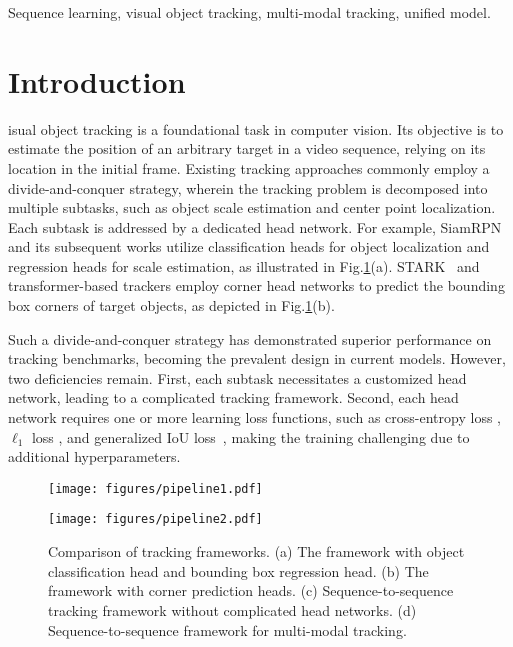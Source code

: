 \begin{IEEEkeywords}
Sequence learning, visual object tracking, multi-modal tracking, unified model.
\end{IEEEkeywords}

\section{Introduction}
isual object tracking is a foundational task in computer vision. Its objective is to estimate the position of an arbitrary target in  a video sequence, relying on its location in the initial frame. Existing tracking approaches commonly employ a divide-and-conquer strategy, wherein the tracking problem is decomposed into multiple subtasks, such as object scale estimation and center point localization.
Each subtask is addressed by a dedicated head network. For example, SiamRPN \cite{SiameseRPN} and its subsequent works \cite{DiMP, Ocean, transt, TMT, ostrack} utilize classification heads for object localization and regression heads for scale estimation, as illustrated in Fig.\ref{fig:pipeline}(a). STARK~\cite{Stark} and transformer-based trackers \cite{CSWinTT, simtrack, AiATrack} employ corner head networks to predict the bounding box corners of target objects, as depicted in Fig.\ref{fig:pipeline}(b).

Such a divide-and-conquer strategy has demonstrated superior performance on tracking benchmarks, becoming the prevalent design in current models. However, two deficiencies remain. First, each subtask necessitates a customized head network, leading to a complicated tracking framework. Second, each head network requires one or more learning loss functions, such as cross-entropy loss \cite{SiameseRPN, transt}, $\ell_1$ loss \cite{SiameseRPN, transt, Stark, ostrack}, and generalized IoU loss~\cite{transt, Stark, ostrack}, making the training challenging due to additional hyperparameters.

\begin{figure}[!t]
\begin{center}
\texttt{[image: figures/pipeline1.pdf]}
\end{center}
\begin{center}
\texttt{[image: figures/pipeline2.pdf]}
\end{center}
    \vspace{-3mm}
   \caption{
   Comparison of tracking frameworks. (a) The framework with object classification head and bounding box regression head. (b) The framework with corner prediction heads. (c) Sequence-to-sequence tracking framework without complicated head networks. (d) Sequence-to-sequence framework for multi-modal tracking.} 
       \vspace{-5mm}
\label{fig:pipeline}
\end{figure}

